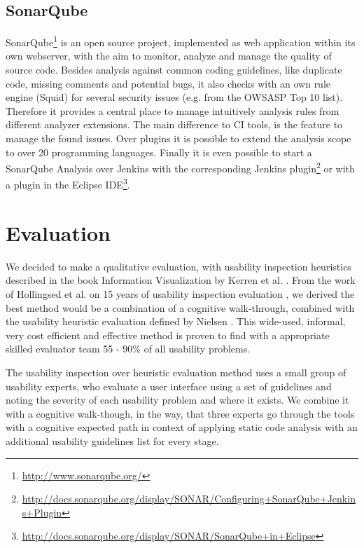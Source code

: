 \documentclass[conference]{IEEEtran}
\begin{document}
\subsection{SonarQube}
\label{subsec:sonarqube}
SonarQube\footnote{\href{http://www.sonarqube.org/}{http://www.sonarqube.org/}} is an open source project, implemented as web application within its own webserver, with the aim to monitor, analyze and manage the quality of source code. 
Besides analysis against common coding guidelines, like duplicate code, missing comments and potential bugs, it also checks with an own rule engine (Squid) for several security issues (e.g. from the OWSASP Top 10 list).
Therefore it provides a central place to manage intuitively analysis rules from different analyzer extensions.
The main difference to CI tools, is the feature to manage the found issues.
Over plugins it is possible to extend the analysis scope to over 20 programming languages.
Finally it is even possible to start a SonarQube Analysis over Jenkins with the corresponding Jenkins plugin\footnote{\href{http://docs.sonarqube.org/display/SONAR/Configuring+SonarQube+Jenkins+Plugin}{http://docs.sonarqube.org/display/SONAR/Configuring+SonarQube+Jenkins+Plugin}}  or with a plugin in the Eclipse IDE\footnote{\href{http://docs.sonarqube.org/display/SONAR/SonarQube+in+Eclipse}{http://docs.sonarqube.org/display/SONAR/SonarQube+in+Eclipse}}.



\section{Evaluation}
\label{sec:evaluation}
We decided to make a qualitative evaluation, with usability inspection heuristics described in the book Information Visualization by Kerren et al. \cite{InformationVisualizationBook}.
From the work of Hollingsed et al. on 15 years of usability inspection evaluation \cite{15yearsUsabilityEvaluation}, we derived the best method would be a combination of a cognitive walk-through, combined with the usability heuristic evaluation defined by Nielsen \cite{Nielsen:UsabilityInspectionMethods}.
This wide-used, informal, very cost efficient and effective method is proven to find with a appropriate skilled evaluator team 55 - 90\% of all usability problems.


The usability inspection over heuristic evaluation method uses a small group of usability experts, who evaluate a
user interface using a set of guidelines and noting the severity of
each usability problem and where it exists. 
We combine it with a cognitive walk-though, in the way, that three experts go through the tools with a cognitive expected path in context of applying static code analysis with an additional usability guidelines list for every stage.
\end{document}
